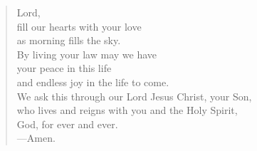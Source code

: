 \prayer

\setlength{\vleftmargin}{\prayerleftmargini}

\begin{verse}
Lord,\\
fill our hearts with your love\\
as morning fills the sky.\\
By living your law may we have\\
your peace in this life\\
and endless joy in the life to come.\\
We ask this through our Lord Jesus Christ, your Son,\\
who lives and reigns with you and the Holy Spirit,\\
God, for ever and ever.\\
{\color{red}---\thinspace}Amen.
\end{verse}

\setlength{\vleftmargin}{\defleftmargini}